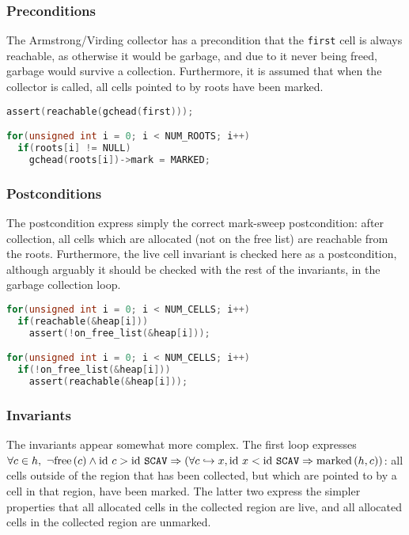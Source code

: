 \subsubsection{Preconditions}
\label{sec:results-impl-ms-pre}

The Armstrong/Virding collector has a precondition that the
\texttt{first} cell is always reachable, as otherwise it would be
garbage, and due to it never being freed, garbage would survive a
collection. Furthermore, it is assumed that when the collector is
called, all cells pointed to by roots have been marked.

\begin{lstlisting}[language=C,caption={Armstrong/Virding Preconditions}]
assert(reachable(gchead(first)));

for(unsigned int i = 0; i < NUM_ROOTS; i++)
  if(roots[i] != NULL)
    gchead(roots[i])->mark = MARKED;
\end{lstlisting}

\subsubsection{Postconditions}
\label{sec:results-impl-ms-post}

The postcondition express simply the correct mark-sweep postcondition:
after collection, all cells which are allocated (not on the free list)
are reachable from the roots. Furthermore, the live cell invariant is
checked here as a postcondition, although arguably it should be
checked with the rest of the invariants, in the garbage collection
loop.

\begin{lstlisting}[language=C,caption={Armstrong/Virding Postconditions}]
for(unsigned int i = 0; i < NUM_CELLS; i++)
  if(reachable(&heap[i]))
    assert(!on_free_list(&heap[i]));

for(unsigned int i = 0; i < NUM_CELLS; i++)
  if(!on_free_list(&heap[i]))
    assert(reachable(&heap[i]));
\end{lstlisting}

\subsubsection{Invariants}
\label{sec:results-impl-ms-invariants}

The invariants appear somewhat more complex. The first loop expresses
$\forall c \in h,\ \lnot\mathrm{free}\left(c\right) \land \mathrm{id}~c > \mathrm{id}~\mathtt{SCAV} \Rightarrow
(\forall c \hookrightarrow x, \mathrm{id}~x < \mathrm{id}~\mathtt{SCAV} \Rightarrow
\mathrm{marked}\left(h, c\right))$: all cells outside of the region that has been
collected, but which are pointed to by a cell in that region, have
been marked. The latter two express the simpler properties that all
allocated cells in the collected region are live, and all allocated
cells in the collected region are unmarked.

